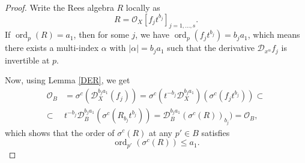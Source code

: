 \documentclass{amsart}
\newcommand{\cO}{{\mathcal O}}
\newcommand{\ord}{{\operatorname{ord}}}
\begin{document}
\begin{proof}
Write the Rees algebra $R$ locally as 
\[
R = \mathcal{O}_X[f_j t^{b_j}]_{j = 1, \ldots, s}.
\]
If $\ord_p(R) = a_1$, then for some $j$, we have $\ord_p(f_j t^{b_j}) = b_j a_1$, which means there exists a multi-index $\alpha$ with $|\alpha| = b_j a_1$ such that the derivative $\mathcal{D}_{x^\alpha} f_j$ is invertible at $p$.

Now, using Lemma \ref{DER}, we get
\begin{align*}
\cO_B&=\sigma^c(\mathcal{D}_X^{b_j a_1}(f_j ))=
\sigma^c( t^{-b_j}\mathcal{D}_X^{b_j a_1})(\sigma^c(f_j t^{b_j})) \subset \\ \subset\,\, &  t^{-b_j} \mathcal{D}_B^{b_j a_1}(\sigma^c(R_{b_j} t^{b_j})) 
= \mathcal{D}_B^{b_j a_1}(\sigma^c(R))_{b_j}) = \mathcal{O}_B,
\end{align*}
which shows that the order of $\sigma^c(R)$ at any $p' \in B$ satisfies 
\[
\ord_{p'}(\sigma^c(R)) \leq a_1.
\]
\end{proof}


\end{document}
